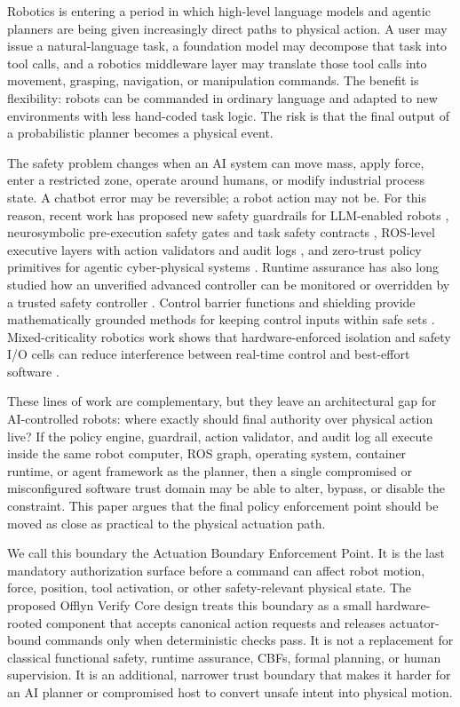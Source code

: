 \documentclass[10pt]{article}
\newcommand{\ovc}{Offlyn Verify Core\xspace}
\newcommand{\abep}{Actuation Boundary Enforcement Point\xspace}
\begin{document}
Robotics is entering a period in which high-level language models and agentic planners are being given increasingly direct paths to physical action. A user may issue a natural-language task, a foundation model may decompose that task into tool calls, and a robotics middleware layer may translate those tool calls into movement, grasping, navigation, or manipulation commands. The benefit is flexibility: robots can be commanded in ordinary language and adapted to new environments with less hand-coded task logic. The risk is that the final output of a probabilistic planner becomes a physical event.

The safety problem changes when an AI system can move mass, apply force, enter a restricted zone, operate around humans, or modify industrial process state. A chatbot error may be reversible; a robot action may not be. For this reason, recent work has proposed new safety guardrails for LLM-enabled robots \cite{roboguard2025}, neurosymbolic pre-execution safety gates and task safety contracts \cite{safegate2026}, ROS-level executive layers with action validators and audit logs \cite{rosclaw2026}, and zero-trust policy primitives for agentic cyber-physical systems \cite{ztpm2026}. Runtime assurance has also long studied how an unverified advanced controller can be monitored or overridden by a trusted safety controller \cite{simplex2021,nasa2024rta}. Control barrier functions and shielding provide mathematically grounded methods for keeping control inputs within safe sets \cite{ames2019cbf,shields2022}. Mixed-criticality robotics work shows that hardware-enforced isolation and safety I/O cells can reduce interference between real-time control and best-effort software \cite{jiao2026}.

These lines of work are complementary, but they leave an architectural gap for AI-controlled robots: where exactly should final authority over physical action live? If the policy engine, guardrail, action validator, and audit log all execute inside the same robot computer, ROS graph, operating system, container runtime, or agent framework as the planner, then a single compromised or misconfigured software trust domain may be able to alter, bypass, or disable the constraint. This paper argues that the final policy enforcement point should be moved as close as practical to the physical actuation path.

We call this boundary the \abep. It is the last mandatory authorization surface before a command can affect robot motion, force, position, tool activation, or other safety-relevant physical state. The proposed \ovc design treats this boundary as a small hardware-rooted component that accepts canonical action requests and releases actuator-bound commands only when deterministic checks pass. It is not a replacement for classical functional safety, runtime assurance, CBFs, formal planning, or human supervision. It is an additional, narrower trust boundary that makes it harder for an AI planner or compromised host to convert unsafe intent into physical motion.
\end{document}
